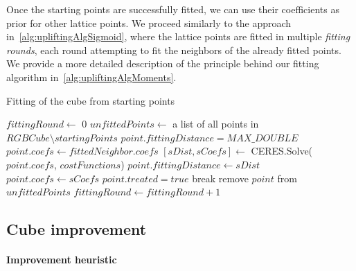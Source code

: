 Once the starting points are successfully fitted, we can use their coefficients as prior for other lattice points.
We proceed similarly to the approach in~\cref{alg:upliftingAlgSigmoid}, where the lattice points are fitted in multiple \emph{fitting rounds}, each round attempting to fit the neighbors of the already fitted points. We provide a more detailed description of the principle behind our fitting algorithm in~\cref{alg:upliftingAlgMoments}.

\begin{algorithm}[t!]
	\caption{Fitting of the cube from starting points}
	\label{alg:upliftingAlgMoments}
	\begin{algorithmic}[1]
		\State $fittingRound \gets$ $0$
		\State $unfittedPoints \gets$ a list of all points in $RGBCube \setminus startingPoints$
		\State $point.fittingDistance = MAX\_DOUBLE$
		\EndFor
		 \label{algStep:coefficientRecomputation}
		\Else
		\State $point.coefs \gets fittedNeighbor.coefs$
		\EndIf 
		\State $[sDist,sCoefs]\gets$ CERES.Solve($point.coefs$, $costFunctions$)
		\State $point.fittingDistance \gets sDist$
		\State $point.coefs \gets sCoefs$
		\EndIf
		\State $point.treated = true$
		\State break
		\EndIf
		\EndFor
		\State remove $point$ from $unfittedPoints$
		\EndIf
		\EndFor	
		\State $fittingRound \gets fittingRound+1$
		\EndWhile
	\end{algorithmic}
\end{algorithm}

\subsection{Cube improvement} \label{ssec:cubeImprovement}

\paragraph{Improvement heuristic} \label{par:improvementHeuristics}

